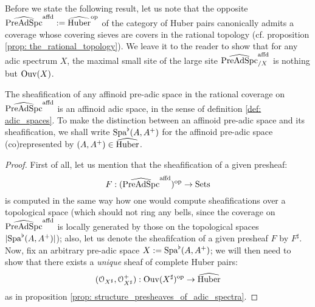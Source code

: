             \begin{remark}
                Before we state the following result, let us note that the opposite $\widehat{\mathrm{Pre}\mathrm{Ad}\mathrm{Spc}}^{\mathrm{affd}} := \widehat{\mathrm{Huber}}^{\mathrm{op}}$ of the category of Huber pairs canonically admits a coverage whose covering sieves are covers in the rational topology (cf. proposition \ref{prop: the_rational_topology}). We leave it to the reader to show that for any adic spectrum $X$, the maximal small site of the large site $\widehat{\mathrm{Pre}\mathrm{Ad}\mathrm{Spc}}^{\mathrm{affd}}_{/X}$ is nothing but $\mathrm{Ouv}(X)$.
            \end{remark}
            \begin{theorem} \label{theorem: sheafifying_pre_adic_spaces}
                The sheafification of any affinoid pre-adic space in the rational coverage on $\widehat{\mathrm{Pre}\mathrm{Ad}\mathrm{Spc}}^{\mathrm{affd}}$ is an affinoid adic space, in the sense of definition \ref{def: adic_spaces}. To make the distinction between an affinoid pre-adic space and its sheafification, we shall write $\mathrm{Spa}^{\flat}(A, A^+)$ for the affinoid pre-adic space (co)represented by $(A, A^+) \in \widehat{\mathrm{Huber}}$.
            \end{theorem}
                \begin{proof}
                    First of all, let us mention that the sheafification of a given presheaf:
                        $$F: (\widehat{\mathrm{Pre}\mathrm{Ad}\mathrm{Spc}}^{\mathrm{affd}})^{\mathrm{op}} \to \mathrm{Sets}$$
                    is computed in the same way how one would compute sheafifications over a topological space (which should not ring any bells, since the coverage on $\widehat{\mathrm{Pre}\mathrm{Ad}\mathrm{Spc}}^{\mathrm{affd}}$ is locally generated by those on the topological spaces $|\mathrm{Spa}^{\flat}(A, A^+)|$); also, let us denote the sheafifcation of a given presheaf $F$ by $F^{\sharp}$. Now, fix an arbitrary pre-adic space $X := \mathrm{Spa}^{\flat}(A, A^+)$; we will then need to show that there exists a \textit{unique} sheaf of complete Huber pairs:
                        $$(\mathcal{O}_{X^{\sharp}}, \mathcal{O}_{X^{\sharp}}^+): \mathrm{Ouv}(X^{\sharp})^{\mathrm{op}} \to \widehat{\mathrm{Huber}}$$
                    as in proposition \ref{prop: structure_presheaves_of_adic_spectra}. 
                \end{proof}
            \begin{example}
                
            \end{example}
            
